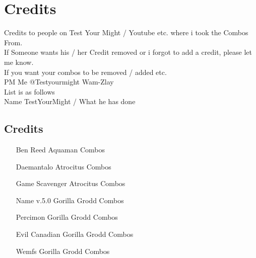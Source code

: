 \documentclass[main.tex]{subfiles}
\begin{document}
\chapter{Credits}

Credits to people on Test Your Might / Youtube etc. where i took the Combos From.\\If Someone wants his / her Credit removed or i forgot to add a credit, please let me know.\\
If you want your combos to be removed / added etc.\\
PM Me @Testyourmight Wam-Zlay\\

List is as follows\\

Name TestYourMight / What he has done\\

\section{Credits}

\begin{itemize}
\item [Ben Reed] Aquaman Combos 
\item [Daemantalo] Atrocitus Combos
\item [Game Scavenger] Atrocitus Combos
\item [Name v.5.0] Gorilla Grodd Combos 
\item [Percimon] Gorilla Grodd Combos
\item [Evil Canadian] Gorilla Grodd Combos
\item [Wemfs] Gorilla Grodd Combos
\end{itemize}
\end{document}
